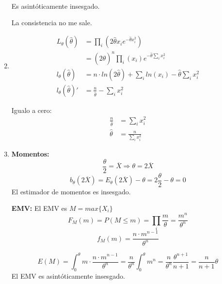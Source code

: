 \begin{enumerate}
		Es asintóticamente insesgado.
		
		La consistencia no me sale.
	\item
		\begin{align*}
			L_{\theta}(\hat \theta)		& = \prod_i \left(2\hat \theta x_i e^{-\hat \theta x_i^2}\right)		\\
										& = (2\hat \theta)^n \prod_i (x_i) e^{-\hat \theta \sum_i x_i^2}			\\
			l_{\theta}(\hat \theta)		& = n\cdot ln(2\hat \theta) + \sum_i ln(x_i) - \hat \theta \sum_i x_i^2	\\
			l_{\theta}(\hat \theta)'	& = \frac{n}{\hat \theta} - \sum_i x_i^2
		\end{align*}
		
		Igualo a cero:
		\begin{align*}
			\frac{n}{\hat \theta}	& = \sum_i x_i^2	\\
			\hat \theta				& = \frac{n}{\sum_i x_i^2}
		\end{align*}
	
	\item
		\textbf{Momentos:}
			$$\frac{\theta}{2} = \overline{X} \Rightarrow \theta = 2\overline X$$
			$$b_\theta(2\overline X) = E_\theta(2\overline X) - \theta = 2 \frac{\theta}{2} - \theta = 0$$
			El estimador de momentos es insesgado.
			
		\textbf{EMV:}
			El EMV es $M=max\{X_i\}$
			$$F_M(m) = P(M\leq m) = \prod_i \frac{m}{\theta} = \frac{m^n}{\theta^n}$$
			$$f_M(m) = \frac{n\cdot m^{n-1}}{\theta^n}$$
			
			$$E(M) = \int_0^{\theta} m\cdot \frac{n\cdot m^{n-1}}{\theta^n}
				= \frac{n}{\theta^n} \int_0^{\theta} m^n
				= \frac{n}{\theta^n} \frac{\theta^{n+1}}{n+1}
				= \frac{n}{n+1}\theta$$
			El EMV es asintóticamente insesgado.
\end{enumerate}
